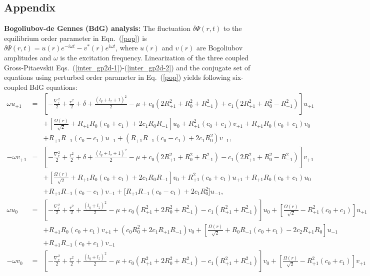 \documentclass[pra,twocolumn,aps,superscriptaddress,showpacs,longbibliography]{revtex4-1}
\begin{document}
\begin{widetext}
\section*{Appendix}
{\bf Bogoliubov-de Gennes (BdG) analysis:}
The fluctuation $\delta {\Psi(r,t)}$ to the equilibrium order parameter in Eqn.~(\ref{pop}) is 
$\delta {\Psi}(r,t) = u(r) e^{-i\omega t}-v^*(r) e^{i\omega t}$, where $u(r)$ and $v(r)$ are
Bogoliubov amplitudes and $\omega$ is the excitation frequency. Linearization of the three coupled Gross-Pitaevskii 
Eqs.~(\ref{inter_gp2d-1})-(\ref{inter_gp2d-2}) and the conjugate set of equations using perturbed order parameter 
in Eq.~(\ref{pop}) yields following six-coupled BdG equations:
 \begin{subequations}
 \begin{eqnarray}
\omega u_{+1}   &=&
 \left[-\frac{\nabla^2_r}{2} +\frac{r^2}{2}+ \delta+ \frac{(l_q+l_z+1)^2}{2}-\mu +c_0 (2R_{+1}^2 +R_0^2+R_{-1}^2)+  c_1(2R_{+1}^2+R_0^2-R_{-1}^2)\right]u_{+1} \nonumber \\
&&
 +\left[\frac{\Omega(r)}{\sqrt{2}}+R_{+1} R_0(c_0+c_1) +2 c_1 R_0 R_{-1}\right]u_0 + R_{+1}^2 (c_0+c_1)v_{+1} + R_{+1} R_0(c_0+c_1) v_0\nonumber \\
&& 
 + R_{+1} R_{-1}(c_0-c_1)u_{-1} +(R_{+1} R_{-1} (c_0-c_1)+2c_1R_0^2)v_{-1}, 
\label{bdg-1u}\\
-\omega v_{+1}   &=&
 \left[-\frac{\nabla^2_r}{2} +\frac{r^2}{2}+ \delta+ \frac{(l_q+l_z+1)^2}{2}-\mu +c_0 (2R_{+1}^2 +R_0^2+R_{-1}^2)-  c_1(2R_{+1}^2+R_0^2-R_{-1}^2)\right]v_{+1}\nonumber\\ && + \left[\frac{\Omega(r)}{\sqrt{2}}+R_{+1} R_0(c_0+c_1)
 +2 c_1 R_0 R_{-1}\right]v_0 + R_{+1}^2 (c_0+c_1)u_{+1} + R_{+1} R_0(c_0+c_1) u_0
\nonumber\\ &&
+ R_{+1} R_{-1}(c_0-c_1)v_{-1} +\big[R_{+1} R_{-1} (c_0-c_1)+2c_1R_0^2 \big]u_{-1},
 \label{bdg-1v} \\
  \omega u_0   &=&
\left[-\frac{\nabla^2_r}{2} +\frac{r^2}{2}+  \frac{(l_q+l_z)^2}{2}-\mu +c_0(R_{+1}^2 +2R_0^2+R_{-1}^2)-c_1(R_{+1}^2+R_{-1}^2)\right]u_0 +\left[\frac{\Omega(r)}{\sqrt{2}} -R_{+1}^2(c_0+c_1)\right]u_{+1} \nonumber \\
  &&
  + R_{+1}R_0(c_0+c_1)v_{+1}+(c_0R_0^2+2c_1R_{+1}R_{-1})v_0+\left[\frac{\Omega(r)}{\sqrt{2}}+R_0R_{-1}(c_0+c_1) -2c_2R_{+1}R_0 \right]u_{-1}\nonumber \\
  &&
  + R_{+1}R_{-1}(c_0+c_1)v_{-1}\label{bdg-2u} \\
-\omega v_0  &=&
 \left[-\frac{\nabla^2_r}{2} +\frac{r^2}{2}+  \frac{(l_q+l_z)^2}{2}-\mu +c_0(R_{+1}^2 +2R_0^2+R_{-1}^2)-c_1(R_{+1}^2+R_{-1}^2)\right]v_{0} +\left[\frac{\Omega(r)}{\sqrt{2}} -R_{+1}^2(c_0+c_1)\right]v_{+1} \nonumber \\

\end{eqnarray}
\end{subequations}
\end{widetext}
\end{document}
